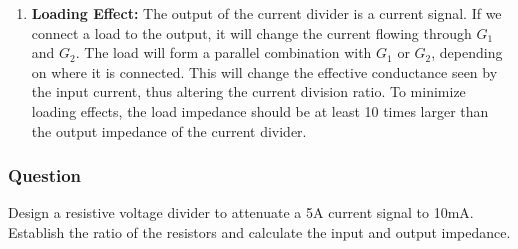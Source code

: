 \begin{enumerate}
    \paragraph{At Output:}
      \begin{align*}
        Z_{out} &= \frac{1}{G_1} + \frac{1}{G_2} \\
        Z_{out} &= R_1 + R_2 \hspace{1cm} \text{(Substituting \(G_1 = \frac{1}{R_1}\) and \(G_2 = \frac{1}{R_2}\))}
      \end{align*}
  \item \textbf{Loading Effect:}
    The output of the current divider is a current signal.
    If we connect a load to the output, it will change the current flowing through
    \(G_1\) and \(G_2\). The load will form a parallel combination with
    \(G_1\) or \(G_2\), depending on where it is connected. This will
    change the effective conductance seen by the input current, thus
    altering the current division ratio. To minimize loading effects,
    the load impedance should be at least 10 times larger than the output
    impedance of the current divider.
\end{enumerate}

\subsubsection{Question}
Design a resistive voltage divider to attenuate a 5A current signal to
10mA. Establish the ratio of the resistors and calculate the input
and output impedance.
